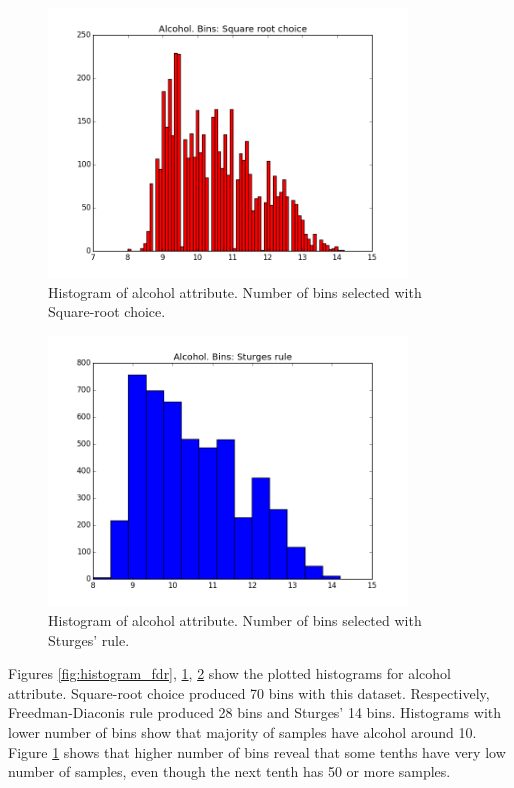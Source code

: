 \documentclass[12pt]{article}
\begin{document}
\begin{figure}[H]
    \centering
    \includegraphics[width=0.85\textwidth]{alcohol_src}
    \caption{Histogram of alcohol attribute. Number of bins selected with Square-root choice.}
    \label{fig:histogram_src}
\end{figure}

\begin{figure}[H]
    \centering
    \includegraphics[width=0.85\textwidth]{alcohol_sturge}
    \caption{Histogram of alcohol attribute. Number of bins selected with Sturges' rule.}
    \label{fig:histogram_sturge}
\end{figure}

Figures \ref{fig:histogram_fdr}, \ref{fig:histogram_src}, \ref{fig:histogram_sturge} show the plotted histograms for alcohol attribute. Square-root choice produced 70 bins with this dataset. Respectively, Freedman-Diaconis rule produced 28 bins and Sturges' 14 bins. Histograms with lower number of bins show that majority of samples have alcohol around 10. Figure \ref{fig:histogram_src} shows that higher number of bins reveal that some tenths have very low number of samples, even though the next tenth has 50 or more samples.%
\end{document}
